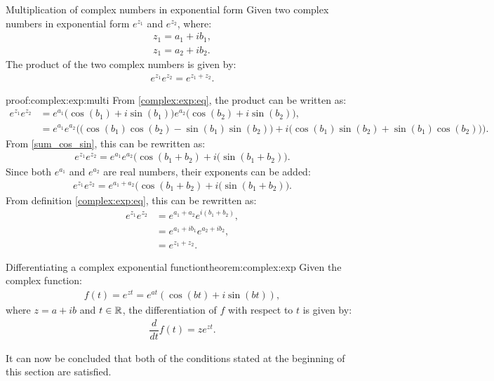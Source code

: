 \begin{theorem}{Multiplication of complex numbers in exponential form}{}
Given two complex numbers in exponential form $e^{z_1}$ and $e^{z_2}$, where:
\begin{align*}
z_1=a_1+ib_1,
\\
z_1=a_2+ib_2.
\end{align*}
The product of the two complex numbers is given by:
\begin{align*}
e^{z_1}e^{z_2}=e^{z_1+z_2}.
\end{align*}
\end{theorem}


\begin{prof}{}{proof:complex:exp:multi}
From \cref{complex:exp:eq}, the product can be written as:
\begin{align*}
e^{z_1}e^{z_2}&=e^{a_1}\big(\cos(b_1)+i\sin(b_1)\big)e^{a_2}\big(\cos(b_2)+i\sin(b_2)\big),
\\
&=e^{a_1}e^{a_2} \Big( \big(\cos(b_1)\cos(b_2)-\sin(b_1) \sin(b_2) \big)+i \big(\cos(b_1)\sin(b_2)+\sin(b_1)\cos(b_2) \big) \Big).
\end{align*}
From \eqref{sum_cos_sin}, this can be rewritten as:
\begin{align*}
e^{z_1}e^{z_2}=e^{a_1}e^{a_2}\big(\cos(b_1+b_2)+i(\sin(b_1+b_2)\big).
\end{align*}
Since both $e^{a_1}$ and $e^{a_2}$ are real numbers, their exponents can be added:
\begin{align*}
e^{z_1}e^{z_2}=e^{a_1+a_2}\big(\cos(b_1+b_2)+i(\sin(b_1+b_2)\big).
\end{align*}
From definition \cref{complex:exp:eq},
this can be rewritten as:
\begin{align*}
e^{z_1}e^{z_2}&=e^{a_1+a_2}e^{i(b_1+b_2)},
\\
&=e^{a_1+ib_1}e^{a_2+ib_2},
\\
&=e^{z_1+z_2}.
\end{align*} 
\end{prof}

\begin{theorem}{Differentiating a complex exponential function}{theorem:complex:exp}
Given the complex function:
\begin{align*}
f(t)=e^{zt}=e^{at}(\cos(bt)+i\sin(bt)),
\end{align*}
where $z=a+ib$ and $t\in \mathbb{R}$, the differentiation of $f$ with respect to $t$ is given by:
\begin{align*}
\dfrac{d}{dt}f(t)=ze^{zt}.
\end{align*}
\end{theorem}



\noindent
It can now be concluded that both of the conditions stated at the beginning of this section are satisfied. 